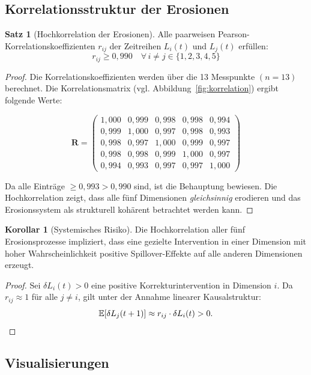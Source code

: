 ﻿\documentclass[a4paper,12pt]{article}
\theoremstyle{definition}
\newtheorem{satz}{Satz}
\newtheorem{korollar}{Korollar}
\begin{document}
\subsection{Korrelationsstruktur der Erosionen}

\begin{satz}[Hochkorrelation der Erosionen]
\label{satz:korrelation}
Alle paarweisen Pearson-Korrelationskoeffizienten $r_{ij}$ der Zeitreihen $L_i(t)$ und $L_j(t)$ erfüllen:
\[
r_{ij} \geq 0{,}990 \quad \forall\, i \neq j \in \{1, 2, 3, 4, 5\}
\]
\end{satz}

\begin{proof}
Die Korrelationskoeffizienten werden über die 13 Messpunkte $(n = 13)$ berechnet. Die Korrelationsmatrix (vgl. Abbildung~\ref{fig:korrelation}) ergibt folgende Werte:

\[
\mathbf{R} = \begin{pmatrix}
1{,}000 & 0{,}999 & 0{,}998 & 0{,}998 & 0{,}994 \\
0{,}999 & 1{,}000 & 0{,}997 & 0{,}998 & 0{,}993 \\
0{,}998 & 0{,}997 & 1{,}000 & 0{,}999 & 0{,}997 \\
0{,}998 & 0{,}998 & 0{,}999 & 1{,}000 & 0{,}997 \\
0{,}994 & 0{,}993 & 0{,}997 & 0{,}997 & 1{,}000
\end{pmatrix}
\]

Da alle Einträge $\geq 0{,}993 > 0{,}990$ sind, ist die Behauptung bewiesen. Die Hochkorrelation zeigt, dass alle fünf Dimensionen \emph{gleichsinnig} erodieren und das Erosionssystem als strukturell kohärent betrachtet werden kann. \qedhere
\end{proof}

\begin{korollar}[Systemisches Risiko]
Die Hochkorrelation aller fünf Erosionsprozesse impliziert, dass eine gezielte Intervention in einer Dimension mit hoher Wahrscheinlichkeit positive Spillover-Effekte auf alle anderen Dimensionen erzeugt.
\end{korollar}

\begin{proof}
Sei $\delta L_i(t) > 0$ eine positive Korrekturintervention in Dimension $i$. Da $r_{ij} \approx 1$ für alle $j \neq i$, gilt unter der Annahme linearer Kausalstruktur:
\[
\mathbb{E}[\delta L_j(t+1)] \approx r_{ij} \cdot \delta L_i(t) > 0. \qedhere
\]
\end{proof}

\subsection{Visualisierungen}
\end{document}
